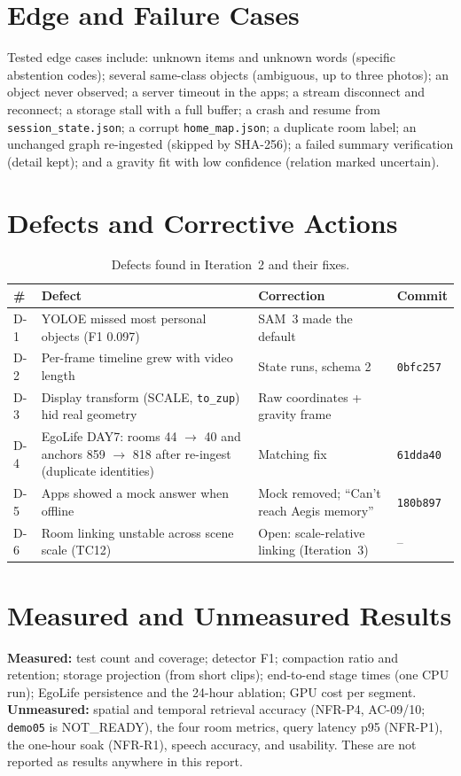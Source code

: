 \section{Edge and Failure Cases}
Tested edge cases include: unknown items and unknown words (specific abstention
codes); several same-class objects (ambiguous, up to three photos); an object
never observed; a server timeout in the apps; a stream disconnect and reconnect;
a storage stall with a full buffer; a crash and resume from
\texttt{session\_state.json}; a corrupt \texttt{home\_map.json}; a duplicate room
label; an unchanged graph re-ingested (skipped by SHA-256); a failed summary
verification (detail kept); and a gravity fit with low confidence (relation
marked uncertain).

\section{Defects and Corrective Actions}
\begin{table}[H]\centering\footnotesize
\caption{Defects found in Iteration~2 and their fixes.}\label{tab:defects}
\begin{tabularx}{\textwidth}{@{}l Y Y l@{}}\toprule
{}\textbf{\#} & \textbf{Defect} & \textbf{Correction} & \textbf{Commit}\\\midrule
D-1 & YOLOE missed most personal objects (F1 0.097) & SAM~3 made the default & \tbd{[ ]}\\
D-2 & Per-frame timeline grew with video length & State runs, schema 2 & \texttt{0bfc257}\\
D-3 & Display transform (SCALE, \texttt{to\_zup}) hid real geometry & Raw coordinates + gravity frame & \tbd{[ ]}\\
D-4 & EgoLife DAY7: rooms 44 $\rightarrow$ 40 and anchors 859 $\rightarrow$ 818 after re-ingest (duplicate identities) & Matching fix & \texttt{61dda40}\\
D-5 & Apps showed a mock answer when offline & Mock removed; ``Can't reach Aegis memory'' & \texttt{180b897}\\
D-6 & Room linking unstable across scene scale (TC12) & Open: scale-relative linking (Iteration~3) & --\\
\bottomrule\end{tabularx}\end{table}

\section{Measured and Unmeasured Results}
\textbf{Measured:} test count and coverage; detector F1; compaction ratio and
retention; storage projection (from short clips); end-to-end stage times (one
CPU run); EgoLife persistence and the 24-hour ablation; GPU cost per segment.
\textbf{Unmeasured:} spatial and temporal retrieval accuracy (NFR-P4, AC-09/10;
\texttt{demo05} is NOT\_READY), the four room metrics, query latency p95
(NFR-P1), the one-hour soak (NFR-R1), speech accuracy, and usability. These are
not reported as results anywhere in this report.
